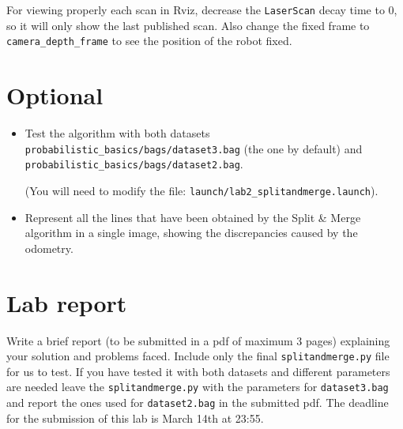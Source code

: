 \documentclass[a4paper,10pt]{article}
\begin{document}
For viewing properly each scan in Rviz, decrease the \texttt{LaserScan} decay time to 0, so it will only show the last published scan. Also change the fixed frame to \texttt{camera\_depth\_frame} to see the position of the robot fixed.

\section{Optional}
\begin{itemize}
    \item Test the algorithm with both datasets \texttt{probabilistic\_basics/bags/dataset3.bag} (the one by default) and \texttt{probabilistic\_basics/bags/dataset2.bag}.
    
    (You will need to modify the file:    \texttt{launch/lab2\_splitandmerge.launch}).
    \item Represent all the lines that have been obtained by the Split \& Merge algorithm in a single image, showing the discrepancies caused by the odometry.
\end{itemize}

\section{Lab report}

Write a brief report (to be submitted in a pdf of maximum 3 pages) explaining your solution and problems faced. Include only the final \texttt{splitandmerge.py} file for us to test. If you have tested it with both datasets and different parameters are needed leave the \texttt{splitandmerge.py} with the parameters for \texttt{dataset3.bag} and report the ones used for \texttt{dataset2.bag} in the submitted pdf. The deadline for the submission of this lab is March 14th at 23:55.
\end{document}
